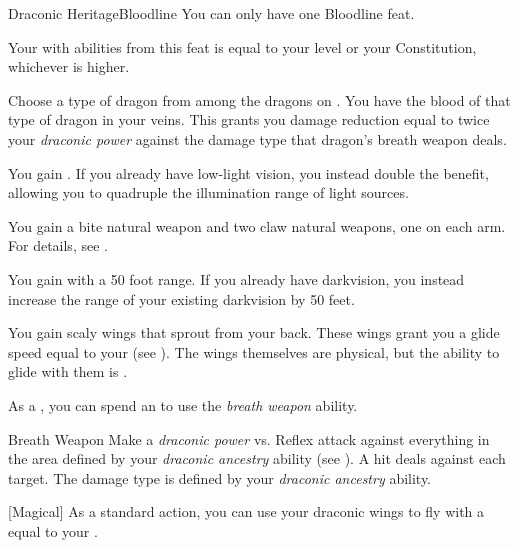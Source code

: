     \begin{feat}{Draconic Heritage}{Bloodline}
         You can only have one Bloodline feat.

         Your  with abilities from this feat is equal to your level or your Constitution, whichever is higher.

         Choose a type of dragon from among the dragons on .
        You have the blood of that type of dragon in your veins.
        This grants you damage reduction equal to twice your \textit{draconic power} against the damage type that dragon's breath weapon deals.

         You gain .
        If you already have low-light vision, you instead double the benefit, allowing you to quadruple the illumination range of light sources.

         You gain a bite natural weapon and two claw natural weapons, one on each arm.
        For details, see .

         You gain  with a 50 foot range.
        If you already have darkvision, you instead increase the range of your existing darkvision by 50 feet.

         You gain scaly wings that sprout from your back.
        These wings grant you a glide speed equal to your  (see ).
        The wings themselves are physical, but the ability to glide with them is .

         As a , you can spend an  to use the \textit{breath weapon} ability.
        \begin{ability}{Breath Weapon}
            Make a \textit{draconic power} vs. Reflex attack against everything in the area defined by your \textit{draconic ancestry} ability (see ).
            A hit deals  against each target.
            The damage type is defined by your \textit{draconic ancestry} ability.
        \end{ability}

        [Magical] 
        As a standard action, you can use your draconic wings to fly with a  equal to your .


\end{feat}
